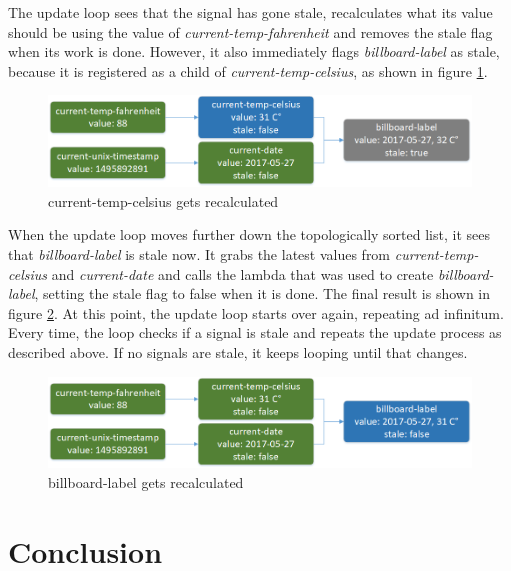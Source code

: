 The update loop sees that the signal has gone stale, recalculates what its value should be using the value of \textit{current-temp-fahrenheit} and removes the stale flag when its work is done.
However, it also immediately flags \textit{billboard-label} as stale, because it is registered as a child of \textit{current-temp-celsius}, as shown in figure \ref{fig:language-frdataflow-3}.

\begin{figure}[h]
	\centerline{\includegraphics[width=\textwidth]{images/language-frdataflow-3.png}}
	\caption{current-temp-celsius gets recalculated}
	\label{fig:language-frdataflow-3}
\end{figure}

When the update loop moves further down the topologically sorted list, it sees that \textit{billboard-label} is stale now. It grabs the latest values from \textit{current-temp-celsius} and \textit{current-date} and calls the lambda that was used to create \textit{billboard-label}, setting the stale flag to false when it is done. The final result is shown in figure \ref{fig:language-frdataflow-4}. 
At this point, the update loop starts over again, repeating ad infinitum. Every time, the loop checks if a signal is stale and repeats the update process as described above. If no signals are stale, it keeps looping until that changes. 

\begin{figure}[h]
	\centerline{\includegraphics[width=\textwidth]{images/language-frdataflow-4.png}}
	\caption{billboard-label gets recalculated}
	\label{fig:language-frdataflow-4}
\end{figure}

\newpage
\section{Conclusion}


